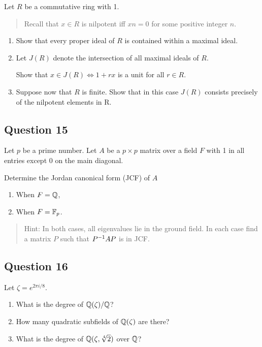 \documentclass[12pt]{article}
\begin{document}
Let \(R\) be a commutative ring with 1.

\begin{quote}
Recall that \(x \in R\) is nilpotent iff \(xn = 0\) for some positive
integer \(n\).
\end{quote}

\begin{enumerate}
\def\labelenumi{(\alph{enumi})}
\item
  Show that every proper ideal of \(R\) is contained within a maximal
  ideal.
\item
  Let \(J(R)\) denote the intersection of all maximal ideals of \(R\).

  Show that \(x \in J(R) \iff 1 + rx\) is a unit for all \(r \in R\).
\item
  Suppose now that \(R\) is finite. Show that in this case \(J(R)\)
  consists precisely of the nilpotent elements in R.
\end{enumerate}

\hypertarget{question-15}{%
\subsection{Question 15}\label{question-15}}

Let \(p\) be a prime number. Let \(A\) be a \(p \times p\) matrix over a
field \(F\) with 1 in all entries except 0 on the main diagonal.

Determine the Jordan canonical form (JCF) of \(A\)

\begin{enumerate}
\def\labelenumi{(\alph{enumi})}
\item
  When \(F = {\mathbb{Q}}\),
\item
  When \(F = {\mathbb{F}}_p\).
\end{enumerate}

\begin{quote}
Hint: In both cases, all eigenvalues lie in the ground field. In each
case find a matrix \(P\) such that \(P^{-1} AP\) is in JCF.
\end{quote}

\hypertarget{question-16}{%
\subsection{Question 16}\label{question-16}}

Let \(\zeta = e^{2\pi i/8}\).

\begin{enumerate}
\def\labelenumi{(\alph{enumi})}
\item
  What is the degree of \({\mathbb{Q}}(\zeta)/{\mathbb{Q}}\)?
\item
  How many quadratic subfields of \({\mathbb{Q}}(\zeta)\) are there?
\item
  What is the degree of \({\mathbb{Q}}(\zeta, \sqrt[4] 2)\) over \({\mathbb{Q}}\)?
\end{enumerate}
\end{document}
